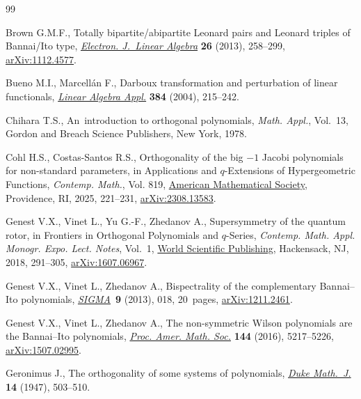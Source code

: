 \documentclass[pdftex]{sigma}
\numberwithin{equation}{section}
\begin{document}
\begin{thebibliography}{99}
\footnotesize\itemsep=0pt

Brown G.M.F., Totally bipartite/abipartite {L}eonard pairs and {L}eonard
 triples of {B}annai/{I}to type,
 \href{https://doi.org/10.13001/1081-3810.1654}{\textit{Electron. J.~Linear
 Algebra}} \textbf{26} (2013), 258--299,
 \href{http://arxiv.org/abs/1112.4577}{arXiv:1112.4577}.

Bueno M.I., Marcell\'an F., Darboux transformation and perturbation of linear
 functionals, \href{https://doi.org/10.1016/j.laa.2004.02.004}{\textit{Linear
 Algebra Appl.}} \textbf{384} (2004), 215--242.

Chihara T.S., An~introduction to orthogonal polynomials, \textit{Math. Appl.},
 Vol.~13, Gordon and Breach Science Publishers, New York, 1978.

Cohl H.S., Costas-Santos R.S., Orthogonality of the big {$-1$} {J}acobi
 polynomials for non-standard parameters, in Applications and {$q$}-Extensions
 of Hypergeometric Functions, \textit{Contemp. Math.}, Vol. 819,
 \href{https://doi.org/10.1090/conm/819/16395}{American Mathematical Society},
 Providence, RI, 2025, 221--231,
 \href{http://arxiv.org/abs/2308.13583}{arXiv:2308.13583}.

Genest V.X., Vinet L., Yu G.-F., Zhedanov A., Supersymmetry of the quantum
 rotor, in Frontiers in Orthogonal Polynomials and {$q$}-Series,
 \textit{Contemp. Math. Appl. Monogr. Expo. Lect. Notes}, Vol.~1,
 \href{https://doi.org/10.1142/9789813228887_0015}{World Scientific
 Publishing}, Hackensack, NJ, 2018, 291--305,
 \href{http://arxiv.org/abs/1607.06967}{arXiv:1607.06967}.

Genest V.X., Vinet L., Zhedanov A., Bispectrality of the complementary
 {B}annai--{I}to polynomials,
 \href{https://doi.org/10.3842/SIGMA.2013.018}{\textit{SIGMA}}~\textbf{9}
 (2013), 018, 20~pages,
 \href{http://arxiv.org/abs/1211.2461}{arXiv:1211.2461}.

Genest V.X., Vinet L., Zhedanov A., The non-symmetric {W}ilson polynomials are
 the {B}annai--{I}to polynomials,
 \href{https://doi.org/10.1090/proc/13141}{\textit{Proc. Amer. Math. Soc.}}
 \textbf{144} (2016), 5217--5226,
 \href{http://arxiv.org/abs/1507.02995}{arXiv:1507.02995}.

Geronimus J., The orthogonality of some systems of polynomials,
 \href{https://doi.org/10.1215/S0012-7094-47-01441-5}{\textit{Duke Math.~J.}}
 \textbf{14} (1947), 503--510.


\end{thebibliography}
\end{document}
